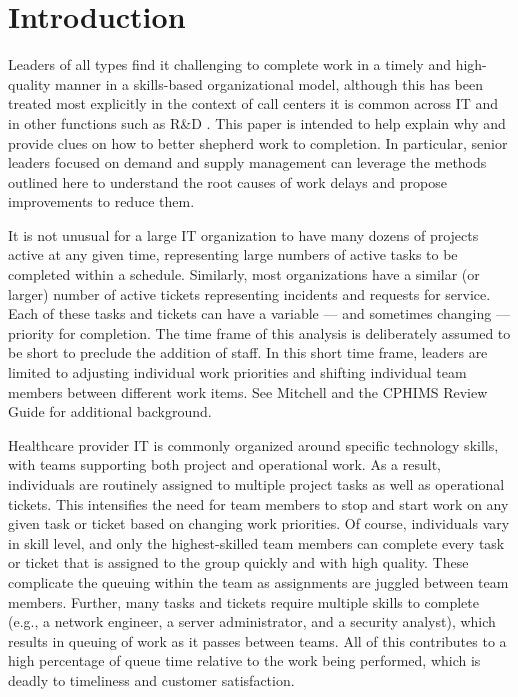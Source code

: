 \documentclass[conference]{IEEEtran}
\begin{document}
\section{Introduction} 

Leaders of all types find it challenging to complete work in a timely and high-quality manner in a skills-based organizational model, although this has been treated most explicitly in the context of call centers \cite{stolletz_performance_2004,koole_routing_2003} it is common across IT and in other functions such as R\&D \cite{hematian_multiobjective_2020}. This paper is intended to help explain why and provide clues on how to better shepherd work to completion. In particular, senior leaders focused on demand and supply management can leverage the methods outlined here to understand the root causes of work delays and propose improvements to reduce them.

It is not unusual for a large IT organization to have many dozens of projects active at any given time, representing large numbers of active tasks to be completed within a schedule. Similarly, most organizations have a similar (or larger) number of active tickets representing incidents and requests for service. Each of these tasks and tickets can have a variable --- and sometimes changing --- priority for completion. The time frame of this analysis is deliberately assumed to be short to preclude the addition of staff. In this short time frame, leaders are limited to adjusting individual work priorities and shifting individual team members between different work items. See Mitchell \cite{mitchell_basic_1997} and the CPHIMS Review Guide \cite{society_himss_cphims_2021} for additional background.

Healthcare provider IT is commonly organized around specific technology skills, with teams supporting both project and operational work. As a result, individuals are routinely assigned to multiple project tasks as well as operational tickets. This intensifies the need for team members to stop and start work on any given task or ticket based on changing work priorities. Of course, individuals vary in skill level, and only the highest-skilled team members can complete every task or ticket that is assigned to the group quickly and with high quality. These complicate the queuing within the team as assignments are juggled between team members. Further, many tasks and tickets require multiple skills to complete (e.g., a network engineer, a server administrator, and a security analyst), which results in queuing of work as it passes between teams. All of this contributes to a high percentage of queue time relative to the work being performed, which is deadly to timeliness and customer satisfaction.
\end{document}
